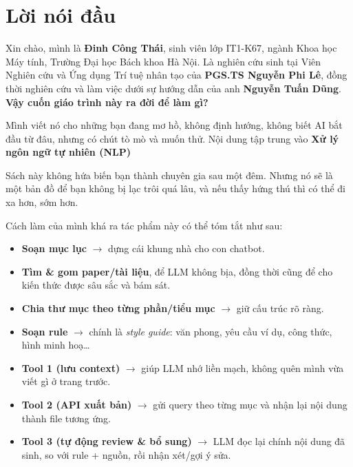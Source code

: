 \chapter*{Lời nói đầu}

\noindent
Xin chào, mình là \textbf{Đinh Công Thái}, sinh viên lớp IT1-K67, ngành Khoa học Máy tính, Trường Đại học Bách khoa Hà Nội. Là nghiên cứu sinh tại Viên Nghiên cứu và Ứng dụng Trí tuệ nhân tạo của \textbf{PGS.TS Nguyễn Phi Lê}, đồng thời nghiên cứu và làm việc dưới sự hướng dẫn của anh \textbf{Nguyễn Tuấn Dũng}.\\


\vspace{1em}
\noindent
\textbf{Vậy cuốn giáo trình này ra đời để làm gì?}  

Mình viết nó cho những bạn đang mơ hồ, không định hướng, không biết AI bắt đầu từ đâu, nhưng có chút tò mò và muốn thử. Nội dung tập trung vào \textbf{Xử lý ngôn ngữ tự nhiên (NLP)}

Sách này không hứa biến bạn thành chuyên gia sau một đêm. Nhưng nó sẽ là một bản đồ để bạn không bị lạc trôi quá lâu, và nếu thấy hứng thú thì có thể đi xa hơn, sớm hơn.


Cách làm của mình khá ra tác phẩm này có thể tóm tắt như sau:

\begin{itemize}
    \item \textbf{Soạn mục lục} $\rightarrow$ dựng cái khung nhà cho con chatbot.
    \item \textbf{Tìm \& gom paper/tài liệu}, để LLM không bịa, đồng thời cũng để cho kiến thức được sâu sắc và bám sát.
    \item \textbf{Chia thư mục theo từng phần/tiểu mục} $\rightarrow$ giữ cấu trúc rõ ràng.
    \item \textbf{Soạn rule} $\rightarrow$ chính là \textit{style guide}: văn phong, yêu cầu ví dụ, công thức, hình minh hoạ…
    \item \textbf{Tool 1 (lưu context)} $\rightarrow$ giúp LLM nhớ liền mạch, không quên mình vừa viết gì ở trang trước.
    \item \textbf{Tool 2 (API xuất bản)} $\rightarrow$ gửi query theo từng mục và nhận lại nội dung thành file tương ứng.
    \item \textbf{Tool 3 (tự động review \& bổ sung)} $\rightarrow$ LLM đọc lại chính nội dung đã sinh, so với rule + nguồn, rồi nhận xét/gợi ý sửa.
\end{itemize}

